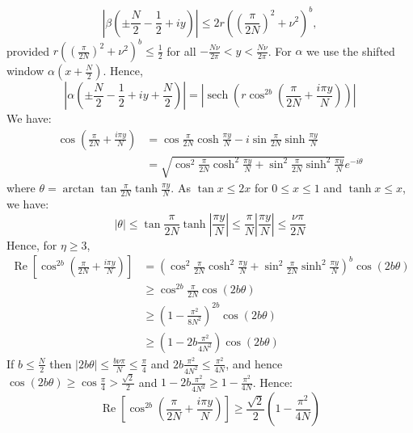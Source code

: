 \begin{equation}
\left|\beta\left(\pm\frac{N}{2}-\frac12+iy\right)\right|
\leq
2r\left(
\left(\frac{\pi}{2N}\right)^2+\nu^2
\right)^{b},
\label{eq:verticalbetabound}
\end{equation}
provided $r\left(
\left(\frac{\pi}{2N}\right)^2+\nu^2
\right)^{b}\leq\frac12$ for all $-\frac{N\nu}{2\pi}<y<\frac{N\nu}{2\pi}$.
For $\alpha$ we use the shifted window $\alpha(x+\frac{N}{2})$. Hence,
\begin{equation}
    \left|\alpha(\pm\frac{N}{2}-\frac12+iy+\frac{N}{2})\right| = \left|\operatorname{sech}\!\left(
r\cos^{2b}\left(\frac{\pi}{2N} +\frac{i\pi y}{N}\right)
\right)\right|
\end{equation}
We have:
\begin{align}
   \cos\left(\frac{\pi}{2N} +\frac{i \pi y}{N}\right) &= \cos \frac{\pi}{2N} \cosh \frac{ \pi y}{N} -i \sin \frac{\pi}{2N} \sinh \frac{ \pi y}{N} \\
   &= \sqrt{\cos^2 \frac{\pi}{2N} \cosh^2 \frac{ \pi y}{N}+\sin^2 \frac{\pi}{2N} \sinh^2 \frac{ \pi y}{N} }e^{-i\theta}
\end{align}
where $\theta = \arctan \tan \frac{\pi}{2N} \tanh \frac{ \pi y}{N} $. As $\tan x \leq 2x$ for $ 0\leq x \leq 1$ and $\tanh x \leq x$, we have:
\begin{equation}
    |\theta| \leq \tan \frac{\pi}{2N} \tanh \left|\frac{ \pi y}{N}\right| \leq \frac{\pi}{N}\left|\frac{ \pi y}{N}\right|\leq \frac{\nu\pi}{2N}
\end{equation}
Hence, for $\eta \geq 3$,
\begin{align}
   \operatorname{Re} \left[\cos^{2b}\left(\frac{\pi}{2N} +\frac{i \pi y}{N}\right) \right] &= \left(\cos^2 \frac{\pi}{2N} \cosh^2 \frac{ \pi y}{N}+\sin^2 \frac{\pi}{2N} \sinh^2 \frac{ \pi y}{N} \right)^{b} \cos (2b \theta) \\
   &\geq \cos^{2b} \frac{\pi}{2N} \cos (2b\theta)\\
   & \geq \left(1-\frac{\pi^2}{8N^2}\right)^{2b} \cos (2b\theta)\\
   & \geq \left(1-2b\frac{\pi^2}{4N^2}\right)\cos (2b\theta)
\end{align}
If $b \leq \frac{N}{2}$ then $|2b\theta| \leq \frac{b\nu \pi}{N} \leq \frac{\pi}{4}$ and $2b\frac{\pi^2}{4N^2} \leq \frac{\pi^2}{4N}$, and hence $\cos (2b \theta) \geq \cos \frac{\pi}{4} > \frac{\sqrt{2}}{2}$ and $ 1-2b\frac{\pi^2}{4N^2}\geq 1-\frac{\pi^2}{4N}$. Hence:
\begin{equation}
    \operatorname{Re} \left[\cos^{2b}\left(\frac{\pi}{2N} +\frac{i \pi y}{N}\right) \right] \geq \frac{\sqrt{2}}{2}\left(1-\frac{\pi^2}{4N}\right)
\end{equation}
